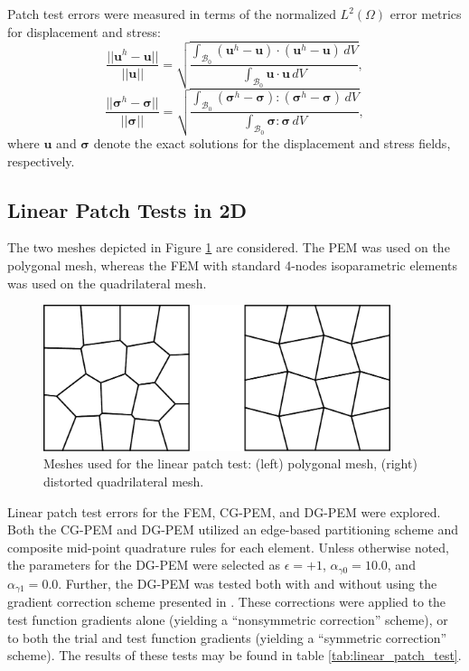 Patch test errors were measured in terms of the normalized $L^2 (\Omega)$ error metrics for displacement and stress:
\begin{equation}
	\frac{||\mathbf{u}^h - \mathbf{u}||}{||\mathbf{u}||} = \sqrt{\frac{\int_{\mathcal{B}_0} (\mathbf{u}^h - \mathbf{u}) \cdot (\mathbf{u}^h - \mathbf{u}) \, dV}{\int_{\mathcal{B}_0} \mathbf{u} \cdot \mathbf{u} \, dV}},
\end{equation}
\begin{equation}
	\frac{||\boldsymbol{\sigma}^h - \boldsymbol{\sigma}||}{||\boldsymbol{\sigma}||} = \sqrt{\frac{\int_{\mathcal{B}_0} (\boldsymbol{\sigma}^h - \boldsymbol{\sigma}) \colon (\boldsymbol{\sigma}^h - \boldsymbol{\sigma}) \, dV}{\int_{\mathcal{B}_0} \boldsymbol{\sigma} \colon \boldsymbol{\sigma} \, dV}},
	\label{eq:normalized_stress_error}
\end{equation}
where $\mathbf{u}$ and $\boldsymbol{\sigma}$ denote the exact solutions for the displacement and stress fields, respectively.

\subsection*{Linear Patch Tests in 2D}

The two meshes depicted in Figure \ref{fig:patch_test_meshes} are considered. The PEM was used on the polygonal mesh, whereas the FEM with standard 4-nodes isoparametric elements was used on the quadrilateral mesh.

\begin{figure}[!h]
    \centering
    \includegraphics[width=4.0in]{figures/patch_test_meshes.pdf}
    	\caption{Meshes used for the linear patch test: (left) polygonal mesh, (right) distorted quadrilateral mesh.}
    \label{fig:patch_test_meshes}
\end{figure}

Linear patch test errors for the FEM, CG-PEM, and DG-PEM were explored. Both the CG-PEM and DG-PEM utilized an edge-based partitioning scheme and composite mid-point quadrature rules for each element. Unless otherwise noted, the parameters for the DG-PEM were selected as $\epsilon = +1$, $\alpha_{\gamma0} = 10.0$, and $\alpha_{\gamma1} = 0.0$. Further, the DG-PEM was tested both with and without using the gradient correction scheme presented in \cite{Talischi:15}. These corrections were applied to the test function gradients alone (yielding a ``nonsymmetric correction'' scheme), or to both the trial and test function gradients (yielding a ``symmetric correction'' scheme). The results of these tests may be found in table \ref{tab:linear_patch_test}.

